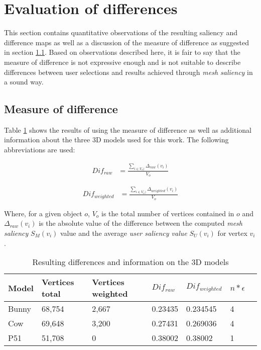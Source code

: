 	\section{Evaluation of differences}
	\label{sec:evaluation_of_differences}
This section contains quantitative observations of the resulting saliency and difference maps as well as a discussion of the measure of difference as suggested in section \ref{sec:measure_of_difference}. Based on observations described here, it is fair to say that the measure of difference is not expressive enough and is not suitable to describe differences between user selections and results achieved through \textit{mesh saliency} in a sound way.

		\subsection{Measure of difference}
		\label{sec:measure_of_difference}
Table \ref{tab:results_results_table} shows the results of using the measure of difference as well as additional information about the three 3D models used for this work. The following abbreviations are used:

\begin{align*}
Dif_{raw} &= \frac
	{
		\sum_{i \in V_{o})}
			\Delta_{raw}(v_i)
	}{
		V_{o}
	}
\end{align*}

\begin{align*}
Dif_{weighted} &= \frac
	{
		\sum_{i \in V_{o})}
			\Delta_{weighted}(v_i)
	}{
		V_{o}
	}
\end{align*}

Where, for a given object $o$, $V_{o}$ is the total number of vertices contained in $o$ and $\Delta_{raw}(v_i)$ is the absolute value of the difference between the computed \textit{mesh saliency} $S_{M}(v_i)$ value and the average \textit{user saliency value} $S_{U}(v_i)$ for vertex $v_i$.

\begin{table}[]
\begin{tabular}{l|llllll}
Model &	Vertices total &		Vertices weighted &	$Dif_{raw}$ &			$Dif_{weighted}$ &	$n*\epsilon$	\\ \hline
Bunny &	68,754 &			2,667 &			0.23435 &			0.234545 &		4			\\
Cow &	69,648 &			3,200 &			0.27431 &			0.269036 &		4			\\
P51 &	51,708 &			0 &			0.38002	&			0.38002 &		1				\\
\end{tabular}
\caption{Resulting differences and information on the 3D models}\label{tab:results_results_table}
\end{table}

